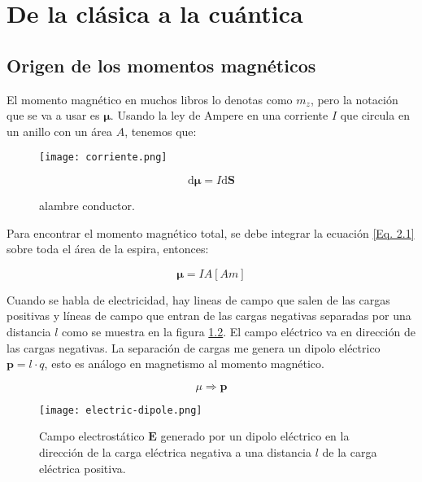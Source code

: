 \documentclass[11pt,fleqn]{book}
\renewcommand{\vec}[1]{\mathbf{#1}}
\begin{document}
\chapter{De la clásica a la cuántica}
    \section{Origen de los momentos magnéticos}

El momento magnético en muchos libros lo denotas como $m_{z}$, pero la notación que se va a usar es $\vec{\mu}$. Usando la ley de Ampere en una corriente $I$ que circula en un anillo con un área $A$, tenemos que:

\begin{figure}[H]
\begin{minipage}[c]{0.5\linewidth}
    \centering
    \texttt{[image: corriente.png]}
    \caption{alambre conductor.}
    \label{Fig. 2.0}
    \end{minipage}
    \begin{minipage}[c]{0.5\linewidth}
\begin{equation}
    \mathrm{d}\vec{\mu}=I\mathrm{d}\vec{S}
    \label{Eq. 2.1}
\end{equation}
\end{minipage}
\end{figure}

Para encontrar el momento magnético total, se debe integrar la ecuación \ref{Eq. 2.1} sobre toda el área de la espira, entonces:

\begin{equation}
    \vec{\mu}=IA [Am]
\end{equation}

Cuando se habla de electricidad, hay lineas de campo que salen de las cargas positivas y líneas de campo que entran de las cargas negativas separadas por una distancia $l$ como se muestra en la figura \ref{Fig. 2.1}. El campo eléctrico va en dirección de las cargas negativas. La separación de cargas me genera un dipolo eléctrico $\vec{p}=l\cdot q$, esto es análogo en magnetismo al momento magnético.

\begin{equation*}
   \mu\Longrightarrow\vec{p}
\end{equation*}

\begin{figure}[H]
    \centering
    \texttt{[image: electric-dipole.png]}
    \caption{Campo electrostático $\vec{E}$ generado por un dipolo eléctrico en la dirección de la carga eléctrica negativa a una distancia $l$ de la carga eléctrica positiva. }
    \label{Fig. 2.1}
\end{figure}
\vspace{-7mm}
\end{document}
